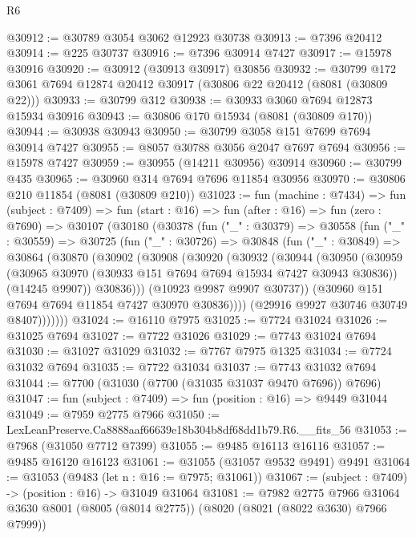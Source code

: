 \begin{lexlean}{R6}
\begin{coremodule}
@30912 := @30789 @3054 @3062 @12923 @30738
@30913 := @7396 @20412
@30914 := @225 @30737
@30916 := @7396 @30914 @7427
@30917 := @15978 @30916
@30920 := @30912 (@30913 @30917) @30856
@30932 := @30799 @172 @3061 @7694 @12874 @20412 @30917 (@30806 @22 @20412 (@8081 (@30809 @22)))
@30933 := @30799 @312
@30938 := @30933 @3060 @7694 @12873 @15934 @30916
@30943 := @30806 @170 @15934 (@8081 (@30809 @170))
@30944 := @30938 @30943
@30950 := @30799 @3058 @151 @7699 @7694 @30914 @7427
@30955 := @8057 @30788 @3056 @2047 @7697 @7694
@30956 := @15978 @7427
@30959 := @30955 (@14211 @30956) @30914
@30960 := @30799 @435
@30965 := @30960 @314 @7694 @7696 @11854 @30956
@30970 := @30806 @210 @11854 (@8081 (@30809 @210))
@31023 := fun (machine : @7434) =>
  fun (subject : @7409) =>
  fun (start : @16) =>
  fun (after : @16) =>
  fun (zero : @7690) =>
  @30107
    (@30180
      (@30378
        (fun ("_" : @30379) =>
        @30558
          (fun ("_" : @30559) =>
          @30725
            (fun ("_" : @30726) =>
            @30848
              (fun ("_" : @30849) =>
              @30864
                (@30870
                  (@30902
                    (@30908
                      (@30920
                        (@30932
                          (@30944
                            (@30950
                              (@30959
                                (@30965 @30970 (@30933 @151 @7694 @7694 @15934 @7427 @30943 @30836))
                                (@14245 @9907))
                              @30836)))
                        (@10923 @9987 @9907 @30737))
                      (@30960 @151 @7694 @7694 @11854 @7427 @30970 @30836))))
                (@29916 @9927 @30746 @30749 @8407)))))))
@31024 := @16110 @7975
@31025 := @7724 @31024
@31026 := @31025 @7694
@31027 := @7722 @31026
@31029 := @7743 @31024 @7694
@31030 := @31027 @31029
@31032 := @7767 @7975 @1325
@31034 := @7724 @31032 @7694
@31035 := @7722 @31034
@31037 := @7743 @31032 @7694
@31044 := @7700 (@31030 (@7700 (@31035 @31037 @9470 @7696)) @7696)
@31047 := fun (subject : @7409) => fun (position : @16) => @9449 @31044
@31049 := @7959 @2775 @7966
@31050 := LexLeanPreserve.Ca8888aaf66639e18b304b8df68dd1b79.R6.__fits_56
@31053 := @7968 (@31050 @7712 @7399)
@31055 := @9485 @16113 @16116
@31057 := @9485 @16120 @16123
@31061 := @31055 (@31057 @9532 @9491) @9491
@31064 := @31053 (@9483 (let n : @16 := @7975; @31061))
@31067 := (subject : @7409) -> (position : @16) -> @31049 @31064
@31081 := @7982
    @2775
    @7966
    @31064
    @3630
    @8001
    (@8005 (@8014 @2775))
    (@8020 (@8021 (@8022 @3630) @7966 @7999))

\end{coremodule}
\end{lexlean}
